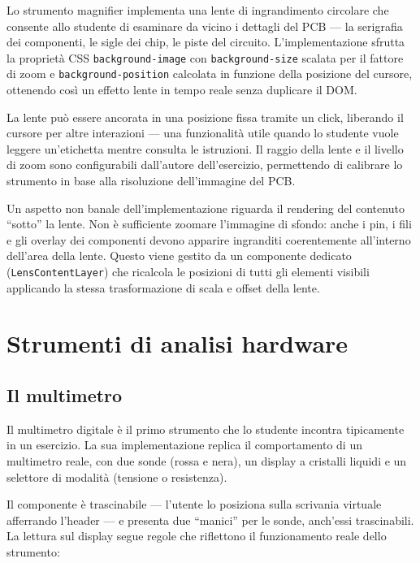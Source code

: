 Lo strumento magnifier implementa una lente di ingrandimento circolare che consente allo studente di esaminare da vicino i dettagli del PCB --- la serigrafia dei componenti, le sigle dei chip, le piste del circuito. L'implementazione sfrutta la proprietà CSS \texttt{background-image} con \texttt{background-size} scalata per il fattore di zoom e \texttt{background-position} calcolata in funzione della posizione del cursore, ottenendo così un effetto lente in tempo reale senza duplicare il DOM.

La lente può essere ancorata in una posizione fissa tramite un click, liberando il cursore per altre interazioni --- una funzionalità utile quando lo studente vuole leggere un'etichetta mentre consulta le istruzioni. Il raggio della lente e il livello di zoom sono configurabili dall'autore dell'esercizio, permettendo di calibrare lo strumento in base alla risoluzione dell'immagine del PCB.


Un aspetto non banale dell'implementazione riguarda il rendering del contenuto ``sotto'' la lente. Non è sufficiente zoomare l'immagine di sfondo: anche i pin, i fili e gli overlay dei componenti devono apparire ingranditi coerentemente all'interno dell'area della lente. Questo viene gestito da un componente dedicato (\texttt{LensContentLayer}) che ricalcola le posizioni di tutti gli elementi visibili applicando la stessa trasformazione di scala e offset della lente.


\section{Strumenti di analisi hardware}
\label{sec:strumenti-analisi}

\subsection{Il multimetro}
\label{subsec:multimetro}

Il multimetro digitale è il primo strumento che lo studente incontra tipicamente in un esercizio. La sua implementazione replica il comportamento di un multimetro reale, con due sonde (rossa e nera), un display a cristalli liquidi e un selettore di modalità (tensione o resistenza).

Il componente è trascinabile --- l'utente lo posiziona sulla scrivania virtuale afferrando l'header --- e presenta due ``manici'' per le sonde, anch'essi trascinabili. La lettura sul display segue regole che riflettono il funzionamento reale dello strumento:

